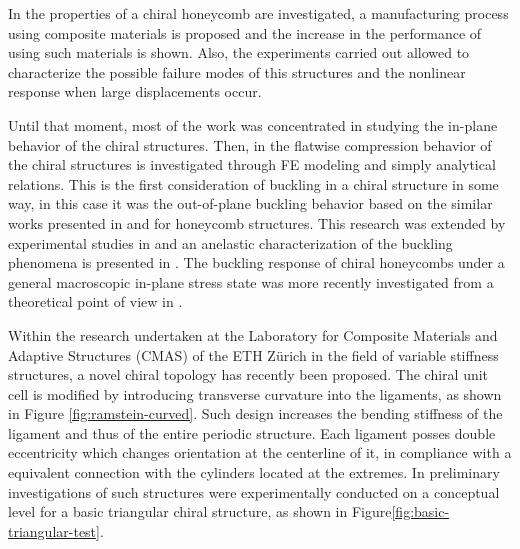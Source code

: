   In \cite{Bettini2010} the properties of a chiral honeycomb are investigated, a manufacturing process using composite materials is proposed and the increase in the performance of using such materials is shown. Also, the experiments carried out allowed to characterize the possible failure modes of this structures and the nonlinear response when large displacements occur.

  Until that moment, most of the work was concentrated in studying the in-plane behavior of the chiral structures. Then, in \cite{Spadoni2005} the flatwise compression behavior of the chiral structures is investigated through FE modeling and simply analytical relations. This is the first consideration of buckling in a chiral structure in some way, in this case it was the out-of-plane buckling behavior based on the similar works presented in \cite{Zhang1992} and \cite{Gibson1999} for honeycomb structures. This research was extended by experimental studies in \cite{Scarpa2007} and an anelastic characterization of the buckling phenomena is presented in \cite{Miller2010}. The buckling response of chiral honeycombs under a general macroscopic in-plane stress state was more recently investigated from a theoretical point of view in \cite{Haghpanah2014}. 

  Within the research undertaken at the Laboratory for Composite Materials and Adaptive Structures (CMAS) of the ETH Z\"urich in the field of variable stiffness structures, a novel chiral topology has recently been proposed. The chiral unit cell is modified by introducing transverse curvature into the ligaments, as shown in Figure \ref{fig:ramstein-curved}. Such design increases the bending stiffness of the ligament and thus of the entire periodic structure. Each ligament posses double eccentricity which changes orientation at the centerline of it, in compliance with a equivalent connection with the cylinders located at the extremes. In \cite{Ramstein2016} preliminary investigations of such structures were experimentally conducted on a conceptual level for a basic triangular chiral structure, as shown in Figure\ref{fig:basic-triangular-test}.

